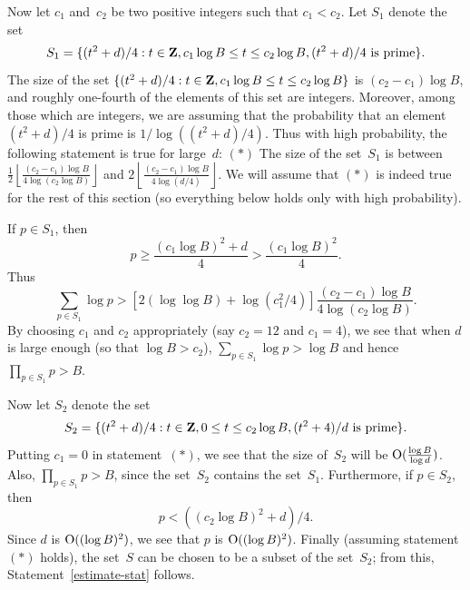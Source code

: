 \documentclass{amsart}
\newcommand{\Z}{{\bf{Z}}}
\newcommand{\ra}{\rightarrow}
\newcommand{\bigo}{{\rm O}}
\theoremstyle{plain}
\begin{document}
Now let $c_1$ and~$c_2$ be two positive integers such that $c_1 < c_2$.
Let $S_1$ denote the set
$$S_1 = \{(t^2+d)/4 : t \in \Z, c_1 \log B \leq t \leq c_2 \log B, 
(t^2+d)/4 \mbox{{\rm\ is prime}} \}.$$
The size of the set 
$\{(t^2+d)/4 : t \in \Z, c_1 \log B \leq t \leq c_2 \log B\}$ is $(c_2 - c_1) \log B$, 
and roughly one-fourth of the elements of this set 
are integers. Moreover, among those which are integers,
we are assuming that the probability that an element $(t^2+d)/4$ is
prime is $1/\log((t^2+d)/4)$. Thus with high probability,
the following statement is true for large~$d$:
\newline $(*)$ The size of the set~$S_1$ is between
$ \frac{1}{2} \left \lfloor \frac{(c_2 - c_1) \log B}{4 \log(c_2 \log B)} 
\right \rfloor$ 
and  $ 2 \left \lfloor \frac{(c_2 - c_1) \log B}{4 \log(d/4)} \right \rfloor$. 
\newline 
We will assume that $(*)$ is indeed true for the rest of this section
(so everything below holds only with high probability).

If $p \in S_1$, then 
$$p \geq \frac{(c_1 \log B)^2 + d}{4} > \frac{ (c_1 \log B)^2}{4}.$$
Thus $$\sum_{p \in S_1} \log p > [2 (\log \log B) + \log (c_1^2/4)]
\frac{(c_2 - c_1) \log B}{4 \log(c_2 \log B)}.$$
By choosing $c_1$ and $c_2$ appropriately (say $c_2=12$ and $c_1=4$), we see
that when $d$ is large enough (so that $\log B > c_2$),
$\sum_{p\in S_1} \log p > \log B$
and hence $\prod_{p\in S_1} p > B$.

Now let $S_2$ denote the set
$$S_2 = \{(t^2+d)/4 : t \in \Z, 0 \leq t \leq c_2 \log B, 
(t^2+4)/d \mbox{{\rm\ is prime}} \}.$$
Putting $c_1=0$ in statement~$(*)$, we see that the size of~$S_2$ 
will be $\bigo(\frac{\log B}{\log d})$. 
\newline
Also, $\prod_{p\in S_1} p > B$, since the set~$S_2$
contains the set~$S_1$. Furthermore, if $p \in S_2$, then 
$$p < ((c_2 \log B)^2 + d)/4.$$ 
Since $d$ is $\bigo((\log B)^2)$,
we see that $p$ is $\bigo((\log B)^2)$.
Finally (assuming statement $(*)$ holds), the set~$S$ can be 
chosen to be a subset of
the set~$S_2$; from this, Statement~\ref{estimate-stat} follows.
\end{document}
